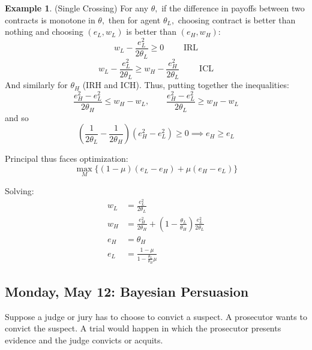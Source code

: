 \documentclass[10pt, oneside]{article}
\theoremstyle{definition}
\newtheorem{exmp}{Example}[section]
\begin{document}
\begin{exmp}
    (Single Crossing) For any $\theta,$ if the difference in payoffs between two contracts is monotone in $\theta,$ then for agent $\theta_L,$ choosing contract is better than  nothing and choosing $(e_L, w_L)$ is better than $(e_H, w_H):$
    \[w_L - \frac{e^2_L}{2\theta_L} \geq 0 \qquad \text{ IRL}\]
    \[w_L - \frac{e^2_L}{2\theta_L} \geq w_H - \frac{e^2_H}{2\theta_L}\qquad \text{ ICL}\] And similarly for $\theta_H$ (IRH and ICH). Thus,  putting together the inequalities:
    \[\frac{e_H^2 - e_L^2}{2\theta_H} \leq w_H - w_L, \qquad \frac{e_H^2 - e_L^2}{2\theta_L} \geq w_H - w_L\] and so 
    \[\left(\frac{1}{2\theta_L} - \frac{1}{2\theta_H}\right)(e_H^2 - e_L^2) \geq 0 \implies e_H \geq e_L\]

    Principal thus faces optimization:
    \[\max_{M}\{(1-\mu)(e_L - e_H) + \mu(e_H - e_L)\}\]

    Solving:
    \begin{align*}
        w_L &= \frac{e_L^2}{2\theta_L}\\
        w_H &= \frac{e_H^2}{2\theta_H}  + (1-\frac{\theta_L}{\theta_H})\frac{e_L^2}{2\theta_L}\\
        e_H &= \theta_H\\
        e_L &= \frac{1 - \mu}{1 - \frac{\theta_L}{\theta_H}\mu}
    \end{align*}

\subsection{Monday, May 12: Bayesian Persuasion}
Suppose a judge or jury has to choose to convict a suspect. A prosecutor wants to convict the suspect. A trial would happen in which the prosecutor presents evidence and the judge convicts or acquits. 


\end{exmp}
\end{document}
